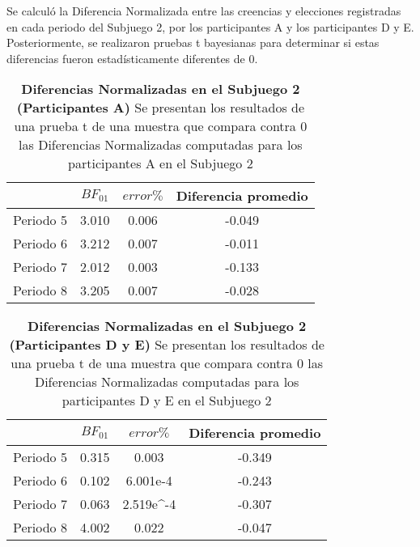 Se calculó la Diferencia Normalizada entre las creencias y elecciones registradas en cada periodo del Subjuego 2, por los participantes A y los participantes D y E. Posteriormente,  se realizaron pruebas t bayesianas para determinar si estas diferencias fueron estadísticamente diferentes de 0.

\begin{table}[h]
\caption[Diferencias Normalizadas en el Subjuego 2; Participante A (Pruebas t de una muestra)]{\textbf{Diferencias Normalizadas en el Subjuego 2 (Participantes A)} Se presentan los resultados de una prueba t de una muestra que compara contra 0 las Diferencias Normalizadas computadas para los participantes A en el Subjuego 2}
\label{DN-S2-A-B}
\centering
\begin{tabular}{l | c c | c}
\toprule
\textbf{} & \textbf{$BF_{01}$} & \textbf{$error\%$} & \textbf{Diferencia promedio}\\
\midrule
Periodo 5 & 3.010 & 0.006 & -0.049\\
Periodo 6 & 3.212 & 0.007 & -0.011\\
Periodo 7 & 2.012 & 0.003 & -0.133\\
Periodo 8 & 3.205 & 0.007 & -0.028\\
\bottomrule
\end{tabular}
\end{table}

\begin{table}[h]
\caption[Diferencias Normalizadas en el Subjuego 2; Participantes D y E (Pruebas t de una muestra)]{\textbf{Diferencias Normalizadas en el Subjuego 2 (Participantes D y E)} Se presentan los resultados de una prueba t de una muestra que compara contra 0 las Diferencias Normalizadas computadas para los participantes D y E en el Subjuego 2}
\label{DN-S2-DyE-B}
\centering
\begin{tabular}{l | c c | c}
\toprule
\textbf{} & \textbf{$BF_{01}$} & \textbf{$error\%$} & \textbf{Diferencia promedio}\\
\midrule
Periodo 5 & 0.315 & 0.003 & -0.349\\
Periodo 6 & 0.102 & 6.001e-4 & -0.243\\
Periodo 7 & 0.063 & 2.519e^-4 & -0.307\\
Periodo 8 & 4.002 & 0.022 & -0.047\\
\bottomrule
\end{tabular}
\end{table}
  

